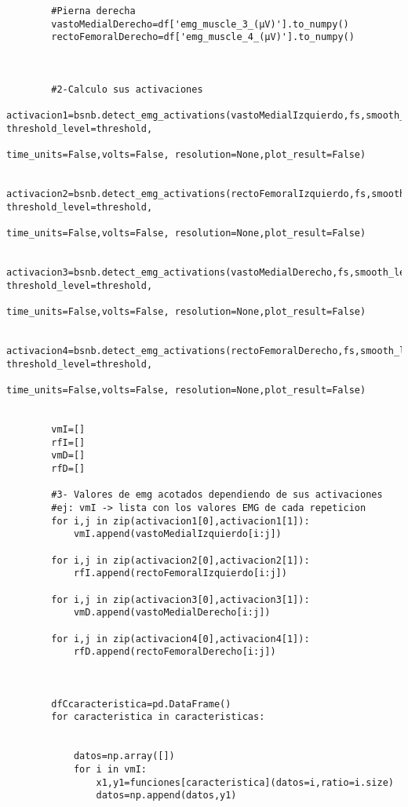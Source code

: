 \begin{lstlisting}
        #Pierna derecha
        vastoMedialDerecho=df['emg_muscle_3_(µV)'].to_numpy()
        rectoFemoralDerecho=df['emg_muscle_4_(µV)'].to_numpy()
        
        
        
        #2-Calculo sus activaciones
        activacion1=bsnb.detect_emg_activations(vastoMedialIzquierdo,fs,smooth_level=smooth, threshold_level=threshold,
                                                    time_units=False,volts=False, resolution=None,plot_result=False)

        activacion2=bsnb.detect_emg_activations(rectoFemoralIzquierdo,fs,smooth_level=smooth, threshold_level=threshold,
                                                    time_units=False,volts=False, resolution=None,plot_result=False)

        activacion3=bsnb.detect_emg_activations(vastoMedialDerecho,fs,smooth_level=smooth, threshold_level=threshold,
                                                    time_units=False,volts=False, resolution=None,plot_result=False)

        activacion4=bsnb.detect_emg_activations(rectoFemoralDerecho,fs,smooth_level=smooth, threshold_level=threshold,
                                                    time_units=False,volts=False, resolution=None,plot_result=False)
        
        
        vmI=[]
        rfI=[]
        vmD=[]
        rfD=[]
        
        #3- Valores de emg acotados dependiendo de sus activaciones
        #ej: vmI -> lista con los valores EMG de cada repeticion
        for i,j in zip(activacion1[0],activacion1[1]):
            vmI.append(vastoMedialIzquierdo[i:j])

        for i,j in zip(activacion2[0],activacion2[1]):
            rfI.append(rectoFemoralIzquierdo[i:j])
            
        for i,j in zip(activacion3[0],activacion3[1]):
            vmD.append(vastoMedialDerecho[i:j])
        
        for i,j in zip(activacion4[0],activacion4[1]):
            rfD.append(rectoFemoralDerecho[i:j])
        
        
        
        dfCcaracteristica=pd.DataFrame()
        for caracteristica in caracteristicas:
            
            
            datos=np.array([])
            for i in vmI:
                x1,y1=funciones[caracteristica](datos=i,ratio=i.size)
                datos=np.append(datos,y1)
                

\end{lstlisting}

